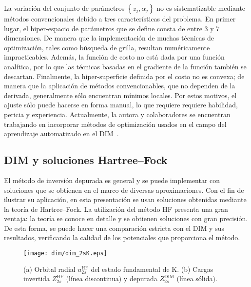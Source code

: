 La variación del conjunto de parámetros $\left\{z_j,\alpha_j\right\}$ no 
es sistematizable mediante métodos convencionales debido a tres 
características del problema. En primer lugar, el hiper-espacio de 
parámetros que se define consta de entre 3 y 7 dimensiones. De manera 
que la implementación de muchas técnicas de optimización, tales como 
búsqueda de grilla, resultan numéricamente impracticables. Además,
la función de costo no está dada por una función analítica, por lo que 
las técnicas basadas en el gradiente de la función también se descartan. 
Finalmente, la hiper-superficie definida por el costo no es convexa; de 
manera que la aplicación de métodos convencionables, que no dependen de 
la derivada, generalmente sólo encuentran mínimos locales. Por estos
motivos, el ajuste sólo puede hacerse en forma manual, lo que requiere 
requiere habilidad, pericia y experiencia. Actualmente, la autora y 
colaboradores se encuentran trabajando en incorporar métodos de 
optimización usados en el campo del aprendizaje automatizado en el 
DIM~\cite{DiFilippo:19}.

\subsection{DIM y soluciones Hartree--Fock}
\label{subsec:invHF}

El método de inversión depurada es general y se puede implementar con 
soluciones que se obtienen en el marco de diversas aproximaciones. Con 
el fin de ilustrar su aplicación, en esta presentación se usan 
soluciones obtenidas mediante la teoría de Hartree--Fock. La utilización 
del método HF presenta una gran ventaja: la teoría se conoce en detalle 
y se obtienen soluciones 
con gran precisión. De esta forma, se puede hacer una comparación 
estricta con el DIM y sus resultados, verificando la calidad de los 
potenciales que proporciona el método.

\begin{figure}[t]
\centering
\texttt{[image: dim/dim\_2sK.eps]} 
\caption[Orbital radial y carga efectiva correspondiente.]
{(a) Orbital radial $u_{2s}^{\mathrm{HF}}$ del estado fundamental de K.
(b) Cargas invertida $Z_{2s}^{\mathrm{HF}}$ (línea discontinua) 
y depurada $Z_{2s}^{\mathrm{DIM}}$ (línea sólida).}
\label{fig:2sK}
\end{figure}

